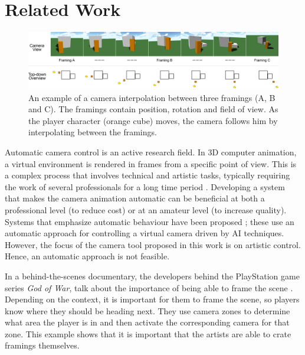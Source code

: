 \section{Related Work}\label{relatedWork}

\begin{figure}[htbp]
\centering
\includegraphics[width=1\textwidth]{Pics/InterpolationExample}
\caption{An example of a camera interpolation between three framings (A, B and C). The framings contain position, rotation and field of view. As the player character (orange cube) moves, the camera follows him by interpolating between the framings.}
\label{fig:InterpolationExample}
\end{figure}

Automatic camera control is an active research field. In 3D computer animation, a virtual environment is rendered in frames from a specific point of view. This is a complex process that involves technical and artistic tasks, typically requiring the work of several professionals for a long time period \cite{burelli_automatic_2014}. Developing a system that makes the camera animation automatic can be beneficial at both a professional level (to reduce cost) or at an amateur level (to increase quality). Systems that emphasize automatic behaviour have been proposed \cite{bourne_constraintBased_2008, burelli_automatic_2014}; these use an automatic approach for controlling a virtual camera driven by AI techniques. However, the focus of the camera tool proposed in this work is on artistic control. Hence, an automatic approach is not feasible.

In a behind-the-scenes documentary, the developers behind the PlayStation game series \textit{God of War}, talk about the importance of being able to frame the scene \cite{gow_camera}. Depending on the context, it is important for them to frame the scene, so players know where they should be heading next. They use camera zones to determine what area the player is in and then activate the corresponding camera for that zone. This example shows that it is important that the artists are able to crate framings themselves.

